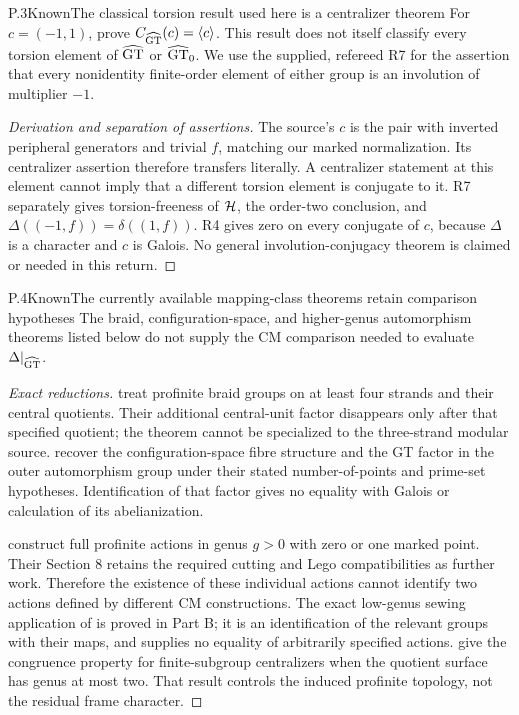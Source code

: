 \begin{statement}{P.3}{Known}{The classical torsion result used here is a centralizer theorem}
For $c=(-1,1)$, \citet[Proposition 4(ii)]{LitLochakSchneps1997}
prove $C_{\widehat{\mathrm{GT}}}(c)=\langle c\rangle$. This result does not itself
classify every torsion element of $\widehat{\mathrm{GT}}$ or $\widehat{\mathrm{GT}}_0$. We use the supplied,
refereed R7 for the assertion that every nonidentity finite-order
element of either group is an involution of multiplier $-1$.
\end{statement}
\begin{proof}[Derivation and separation of assertions]
The source's $c$ is the pair with inverted peripheral generators and
trivial $f$, matching our marked normalization. Its centralizer assertion
therefore transfers literally. A centralizer statement at this element
cannot imply that a different torsion element is conjugate to it.
R7 separately gives torsion-freeness of $\mathcal H$, the order-two conclusion,
and $\Delta((-1,f))=\delta((1,f))$. R4 gives zero on every conjugate
of $c$, because $\Delta$ is a character and $c$ is Galois. No general
involution-conjugacy theorem is claimed or needed in this return.
\end{proof}

\begin{statement}{P.4}{Known}{The currently available mapping-class theorems retain comparison hypotheses}
The braid, configuration-space, and higher-genus automorphism theorems
listed below do not supply the CM comparison needed to evaluate
$\Delta|_{\widehat{\mathrm{GT}}}$.
\end{statement}
\begin{proof}[Exact reductions]
\citet[Theorems A and B]{LitMinamideNakamura2022} treat profinite braid
groups on at least four strands and their central quotients. Their
additional central-unit factor disappears only after that specified
quotient; the theorem cannot be specialized to the three-strand modular
source. \citet[Corollaries B and C]{LitHoshiMinamideMochizuki2022}
recover the configuration-space fibre structure and the GT factor in
the outer automorphism group under their stated number-of-points and
prime-set hypotheses. Identification of that factor gives no equality
with Galois or calculation of its abelianization.

\citet[Theorem 1.1]{LitLochakNakamuraSchneps2026} construct full
profinite actions in genus $g>0$ with zero or one marked point.
Their Section 8 retains the required cutting and Lego compatibilities
as further work. Therefore the existence of these individual actions
cannot identify two actions defined by different CM constructions.
The exact low-genus sewing application of
\citet[Theorem 2.3 and Proposition 2.6(i)]{LitBoggi2026v6} is proved
in Part B; it is an identification of the relevant groups with their
maps, and supplies no equality of arbitrarily specified actions.
\citet[Theorem A and Corollary B]{BoggiSymmetric2026} give the
congruence property for finite-subgroup centralizers when the quotient
surface has genus at most two. That result controls the induced
profinite topology, not the residual frame character.
\end{proof}

